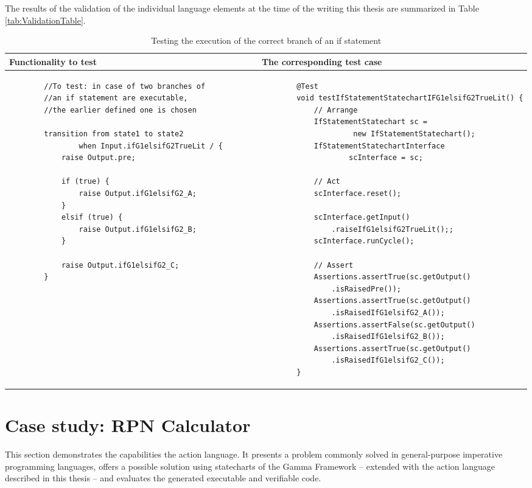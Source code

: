 The results of the validation of the individual language elements at the time of the writing this thesis are summarized in Table \ref{tab:ValidationTable}.

\begin{table}[H]
	\footnotesize
	\centering
	\begin{tabular}{ p{7cm} p{7cm} }
		\toprule
		Functionality to test & The corresponding test case \\
		\midrule
		\begin{lstlisting}
		//To test: in case of two branches of
		//an if statement are executable,
		//the earlier defined one is chosen
		
		transition from state1 to state2 
				when Input.ifG1elsifG2TrueLit / {		
			raise Output.pre;
			
			if (true) {
				raise Output.ifG1elsifG2_A;	
			} 
			elsif (true) {
				raise Output.ifG1elsifG2_B;
			}
			
			raise Output.ifG1elsifG2_C;
		}\end{lstlisting} & 
		\begin{lstlisting}
		@Test
		void testIfStatementStatechartIFG1elsifG2TrueLit() {
			// Arrange
			IfStatementStatechart sc =
					 new IfStatementStatechart();
			IfStatementStatechartInterface 
					scInterface = sc;
			
			// Act
			scInterface.reset();
			
			scInterface.getInput()
				.raiseIfG1elsifG2TrueLit();;
			scInterface.runCycle();
			
			// Assert
			Assertions.assertTrue(sc.getOutput()
				.isRaisedPre());
			Assertions.assertTrue(sc.getOutput()
				.isRaisedIfG1elsifG2_A());
			Assertions.assertFalse(sc.getOutput()
				.isRaisedIfG1elsifG2_B());
			Assertions.assertTrue(sc.getOutput()
				.isRaisedIfG1elsifG2_C());
		}\end{lstlisting} \\
		\bottomrule
	\end{tabular}
	\caption{Testing the execution of the correct branch of an if statement}
	\label{tab:ValidationExample}
\end{table}

\section{Case study: RPN Calculator} \label{section_results_caseStudy}
This section demonstrates the capabilities the action language. It presents a problem commonly solved in general-purpose imperative programming languages, offers a possible solution using statecharts of the Gamma Framework -- extended with the action language described in this thesis -- and evaluates the generated executable and verifiable code.
